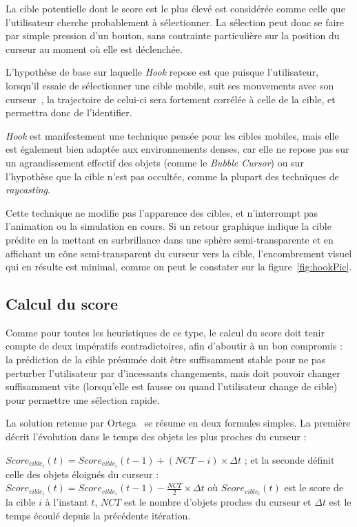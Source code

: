 	La cible potentielle dont le score est le plus élevé est considérée comme celle que l'utilisateur cherche probablement à sélectionner. La sélection peut donc se faire par simple pression d'un bouton, sans contrainte particulière sur la position du curseur au moment où elle est déclenchée.

	L'hypothèse de base sur laquelle \emph{Hook} repose est que puisque l'utilisateur, lorsqu'il essaie de sélectionner une cible mobile, \og suit \fg{} ses mouvements avec son curseur~\cite{hasan2011comet}, la trajectoire de celui-ci sera fortement corrélée à celle de la cible, et permettra donc de l'identifier.
	
	\emph{Hook} est manifestement une technique pensée pour les cibles mobiles, mais elle est également bien adaptée aux environnements denses, car elle ne repose pas sur un agrandissement effectif des objets (comme le \emph{Bubble Cursor}) ou sur l'hypothèse que la cible n'est pas occultée, comme la plupart des techniques de \emph{raycasting}.
	
	Cette technique ne modifie pas l'apparence des cibles, et n'interrompt pas l'animation ou la simulation en cours. Si un retour graphique indique la cible prédite en la mettant en surbrillance dans une sphère semi-transparente et en affichant un cône semi-transparent du curseur vers la cible, l'encombrement visuel qui en résulte est minimal, comme on peut le constater sur la figure~\ref{fig:hookPic}.
	
	\subsection{Calcul du score}
	Comme pour toutes les heuristiques de ce type, le calcul du score doit tenir compte de deux impératifs contradictoires, afin d'aboutir à un bon compromis : la prédiction de la cible présumée doit être suffisamment stable pour ne pas perturber l'utilisateur par d'incessants changements, mais doit pouvoir changer suffisamment vite (lorsqu'elle est fausse ou quand l'utilisateur change de cible) pour permettre une sélection rapide.
	
	La solution retenue par Ortega~\cite{ortega2013hook} se résume en deux formules simples. La première décrit l'évolution dans le temps des objets les plus proches du curseur :
	
	$Score_{cible_{i}}(t) = Score_{cible_{i}}(t-1) + (NCT - i) \times \Delta{}t$ ; et la seconde définit celle des objets éloignés du curseur : $Score_{cible_{i}}(t) = Score_{cible_{i}}(t-1) - \frac{NCT}{2} \times \Delta{}t$ où $Score_{cible_{i}}(t)$ est le score de la cible $i$ à l'instant $t$, $NCT$ est le nombre d'objets proches du curseur et $\Delta{}t$ est le temps écoulé depuis la précédente itération.
	
